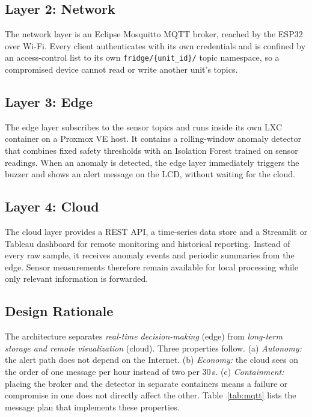 \documentclass[conference]{IEEEtran}
\begin{document}
\subsection{Layer 2: Network}
The network layer is an Eclipse Mosquitto MQTT broker, reached by the ESP32 over Wi-Fi. Every client authenticates with its own credentials and is confined by an access-control list to its own \texttt{fridge/\{unit\_id\}/} topic namespace, so a compromised device cannot read or write another unit's topics.

\subsection{Layer 3: Edge}
The edge layer subscribes to the sensor topics and runs inside its own LXC container on a Proxmox VE host. It contains a rolling-window anomaly detector that combines fixed safety thresholds with an Isolation Forest trained on sensor readings. When an anomaly is detected, the edge layer immediately triggers the buzzer and shows an alert message on the LCD, without waiting for the cloud.

\subsection{Layer 4: Cloud}
The cloud layer provides a REST API, a time-series data store and a Streamlit or Tableau dashboard for remote monitoring and historical reporting. Instead of every raw sample, it receives anomaly events and periodic summaries from the edge. Sensor measurements therefore remain available for local processing while only relevant information is forwarded.

\subsection{Design Rationale}
The architecture separates \emph{real-time decision-making} (edge) from \emph{long-term storage and remote visualization} (cloud). Three properties follow. (a) \emph{Autonomy:} the alert path does not depend on the Internet. (b) \emph{Economy:} the cloud sees on the order of one message per hour instead of two per 30\,s. (c) \emph{Containment:} placing the broker and the detector in separate containers means a failure or compromise in one does not directly affect the other. Table~\ref{tab:mqtt} lists the message plan that implements these properties.
\end{document}
